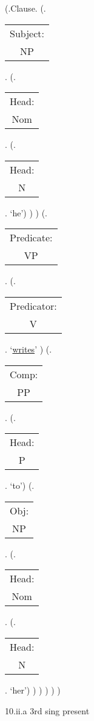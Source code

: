 \documentclass[12pt,letterpaper]{article}
\begin{document}
\begin{figure}
	\begin{center}
		\begin{parsetree}
			(.Clause.
			(.\begin{tabular}{c}Subject:\\NP\end{tabular}.  
			(.\begin{tabular}{c}Head:\\Nom\end{tabular}.
			(.\begin{tabular}{c}Head:\\N\end{tabular}. `he')
			)
			)
			(.\begin{tabular}{c}Predicate:\\VP\end{tabular}.
			(.\begin{tabular}{c}Predicator:\\V\end{tabular}. `\underline{writes}' )
			(.\begin{tabular}{c}Comp:\\PP\end{tabular}.
			(.\begin{tabular}{c}Head:\\P\end{tabular}. `to')
			(.\begin{tabular}{c}Obj:\\NP\end{tabular}. 
			(.\begin{tabular}{c}Head:\\Nom\end{tabular}. 
			(.\begin{tabular}{c}Head:\\N\end{tabular}. `her')
			)
			)
			)
			)
			)
			
			
		\end{parsetree}
		\hfill \break \hfill \break
		10.ii.a 3rd sing present
	\end{center}
\end{figure}
\end{document}
